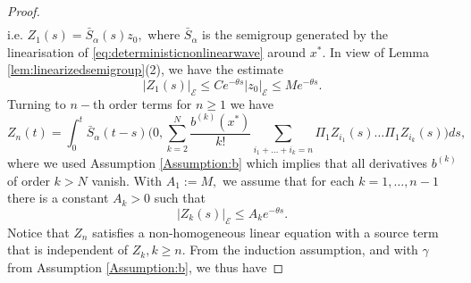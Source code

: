 \documentclass[10pt, reqno]{amsart}
\newcommand{\e}{\mathcal{E}}
\theoremstyle{definition}
\numberwithin{lem}{section}
\numberwithin{cor}{section}
\numberwithin{prop}{section}
\numberwithin{thm}{section}
\numberwithin{dfn}{section}
\begin{document}
\begin{proof}
\begin{equation*}
\begin{aligned}
    \end{aligned}
\end{equation*}
i.e. $Z_1(s)=\bar{S}_\alpha(s) z_0,$ where $\bar{S}_\alpha$ is the semigroup generated by the linearisation of  \eqref{eq:deterministicnonlinearwave} around $x^*.$ In view of Lemma \ref{lem:linearizedsemigroup}(2), we have the estimate
$$|Z_1(s)|_\e\leq Ce^{-\theta s}|z_0|_\e\leq Me^{-\theta s}.$$
Turning to $n-$th order terms for $n\geq 1$ we have
\begin{equation*}
    Z_n(t)=\int_{0}^{t}\bar{S}_\alpha(t-s)\bigg(0, \sum_{k=2}^{N}\frac{b^{(k)}(x^*)}{k!}\sum_{i_1+\dots+i_k=n}\Pi_1Z_{i_1}(s)\dots \Pi_1Z_{i_k}(s)\bigg) ds,
\end{equation*}
where we used Assumption \ref{Assumption:b} which implies that all derivatives $b^{(k)}$ of order $k>N$ vanish.
With $A_1:=M,$ we assume that for each $k=1,\dots,n-1$ there is a constant $A_k>0$ such that 
\begin{equation*}\label{eq:Ak}
   |Z_k(s)|_\e\leq A_ke^{-\theta s}. 
\end{equation*} Notice that $Z_n$ satisfies a non-homogeneous linear equation with a source term that is independent of $Z_k, k\geq n. $ From the induction assumption, and with $\gamma$ from Assumption \ref{Assumption:b}, we thus have 



\end{proof}
\end{document}
